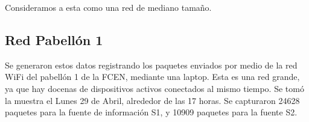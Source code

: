 Consideramos a esta como una red de mediano tamaño.

\subsection{Red Pabellón 1}
Se generaron estos datos registrando los paquetes enviados por medio de 
la red WiFi del pabellón 1 de la FCEN, mediante una laptop. Esta es una 
red grande, ya que hay docenas de dispositivos activos conectados al mismo
tiempo. Se tomó la muestra el Lunes 29 de Abril, alrededor de las 17 horas.
Se capturaron 24628 paquetes para la fuente de información S1, y 10909
paquetes para la fuente S2.
